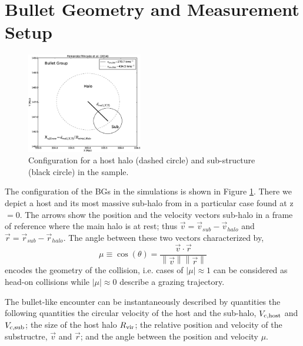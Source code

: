 \documentclass{emulateapj}
\begin{document}
\section{Bullet Geometry and Measurement Setup}
\label{sec:setup}

\begin{figure}
\begin{center}
\includegraphics[width=0.45\textwidth]{Figures_eps/Bullet_Group.eps}
\end{center}
\caption{Configuration for a host halo (dashed circle) and
  sub-structure (black circle) in the sample.}  
\label{fig:configuration}
\end{figure}


The configuration of the BGs in the simulations is shown in Figure
\ref{fig:configuration}. There we depict a host and its most massive
sub-halo from in a particular case found at z$=0$. The arrows show the
position and the velocity vectors sub-halo in a frame of reference
where the main halo is at rest; thus  $\vec{v{}}=\vec{v}_{sub}-\vec{v}_{halo}$ and
$\vec{r}=\vec{r}_{sub}-\vec{r}_{halo}$.  The angle between these two
vectors characterized by,
\begin{equation}
  \mu\equiv
  \cos(\theta)=\frac{\vec{v{}}\cdotp{}\vec{r}}{\left\|\vec{v}{}\right\|
    \left\|\vec{r}\right\|} 
 \end{equation} 
%
encodes the geometry of the collision, i.e. cases of $|\mu|\approx 1$
can be considered as head-on collisions while $|\mu|\approx 0$
describe a grazing trajectory.

The bullet-like encounter can be instantaneously described by
quantities the following quantities the circular velocity of the host
and the sub-halo, $V_{\rm c,host}$ and $V_{\rm c,  sub}$; the size of
the host halo $R_{\rm vir}$; the relative position and velocity of the
substructre, $\vec{v}$ and $\vec{r}$; and the angle between the
position and velocity $\mu$. 
\end{document}
